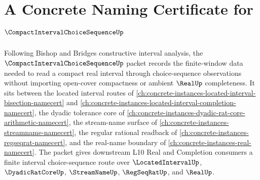 \chapter{A Concrete Naming Certificate for $\CompactIntervalChoiceSequenceUp$}
\label{ch:concrete-instances-compact-interval-choice-sequence-namecert}

Following Bishop and Bridges constructive interval analysis, the $\CompactIntervalChoiceSequenceUp$ packet records the finite-window data needed to read a compact real interval through choice-sequence observations without importing open-cover compactness or ambient $\RealUp$ completeness. It sits between the located interval routes of \autoref{ch:concrete-instances-located-interval-bisection-namecert} and \autoref{ch:concrete-instances-located-interval-completion-namecert}, the dyadic tolerance core of \autoref{ch:concrete-instances-dyadic-rat-core-arithmetic-namecert}, the stream-name surface of \autoref{ch:concrete-instances-streamname-namecert}, the regular rational readback of \autoref{ch:concrete-instances-regseqrat-namecert}, and the real-name boundary of \autoref{ch:concrete-instances-real-namecert}. The packet gives downstream L10 Real and Completion consumers a finite interval choice-sequence route over $\LocatedIntervalUp$, $\DyadicRatCoreUp$, $\StreamNameUp$, $\RegSeqRatUp$, and $\RealUp$.

